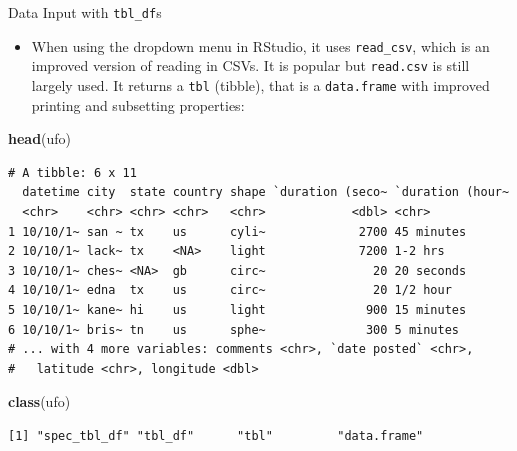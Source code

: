 \documentclass[
  ignorenonframetext,
]{beamer}
\newenvironment{Shaded}{\begin{snugshade}}{\end{snugshade}}
\newcommand{\KeywordTok}[1]{\textcolor[rgb]{0.13,0.29,0.53}{\textbf{#1}}}
\newcommand{\NormalTok}[1]{#1}
\providecommand{\tightlist}{%
  \setlength{\itemsep}{0pt}\setlength{\parskip}{0pt}}
\begin{document}
\begin{frame}[fragile]{Data Input with \texttt{tbl\_df}s}
\protect\hypertarget{data-input-with-tbl_dfs}{}

\begin{itemize}
\tightlist
\item
  When using the dropdown menu in RStudio, it uses \texttt{read\_csv},
  which is an improved version of reading in CSVs. It is popular but
  \texttt{read.csv} is still largely used. It returns a \texttt{tbl}
  (tibble), that is a \texttt{data.frame} with improved printing and
  subsetting properties:
\end{itemize}

\begin{Shaded}
\begin{Highlighting}[]
\KeywordTok{head}\NormalTok{(ufo)}
\end{Highlighting}
\end{Shaded}

\begin{verbatim}
# A tibble: 6 x 11
  datetime city  state country shape `duration (seco~ `duration (hour~
  <chr>    <chr> <chr> <chr>   <chr>            <dbl> <chr>           
1 10/10/1~ san ~ tx    us      cyli~             2700 45 minutes      
2 10/10/1~ lack~ tx    <NA>    light             7200 1-2 hrs         
3 10/10/1~ ches~ <NA>  gb      circ~               20 20 seconds      
4 10/10/1~ edna  tx    us      circ~               20 1/2 hour        
5 10/10/1~ kane~ hi    us      light              900 15 minutes      
6 10/10/1~ bris~ tn    us      sphe~              300 5 minutes       
# ... with 4 more variables: comments <chr>, `date posted` <chr>,
#   latitude <chr>, longitude <dbl>
\end{verbatim}

\begin{Shaded}
\begin{Highlighting}[]
\KeywordTok{class}\NormalTok{(ufo)}
\end{Highlighting}
\end{Shaded}

\begin{verbatim}
[1] "spec_tbl_df" "tbl_df"      "tbl"         "data.frame" 
\end{verbatim}

\end{frame}
\end{document}
